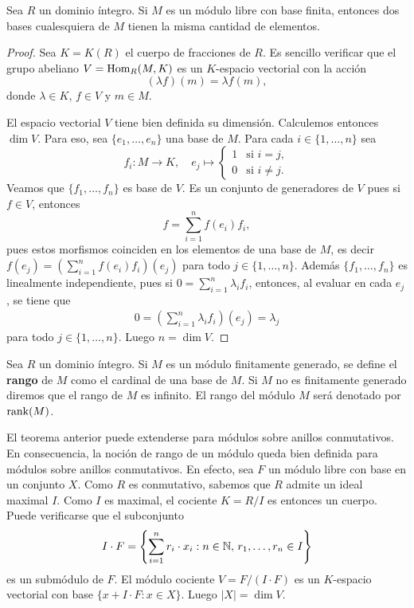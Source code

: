 \begin{theorem}
Sea $R$ un dominio íntegro. 
Si $M$ es un módulo libre con base finita, entonces dos bases cualesquiera de $M$ 
tienen la misma cantidad de elementos.
\end{theorem}

\begin{proof}
Sea $K=K(R)$ el cuerpo de fracciones de $R$. Es sencillo verificar que el grupo abeliano  
$V=\operatorname{Hom}_R(M,K)$ es un $K$-espacio vectorial con la acción 
\[
(\lambda f)(m)=\lambda f(m),
\]
donde $\lambda\in K$, $f\in V$ y $m\in M$.

El espacio vectorial $V$ tiene bien definida su dimensión. 
Calculemos entonces $\dim V$. Para eso, sea $\{e_1,\dots,e_n\}$ una base de $M$. 
Para cada $i\in\{1,\dots,n\}$ sea
\[
f_i\colon M\to K,\quad
e_j\mapsto\begin{cases}
1 & \text{si $i=j$},\\
0 & \text{si $i\ne j$}.
\end{cases}
\]
Veamos que $\{f_1,\dots,f_n\}$ es base de $V$. Es un conjunto de generadores de $V$ pues 
si $f\in V$, entonces
\[
f=\sum_{i=1}^n f(e_i)f_i,
\]
pues estos morfismos coinciden en los elementos de una base de $M$, es decir 
$f(e_j)=(\sum_{i=1}^n f(e_i)f_i)(e_j)$ para todo $j\in\{1,\dots,n\}$.    
Además $\{f_1,\dots,f_n\}$ es linealmente independiente, pues si $0=\sum_{i=1}^n\lambda_if_i$, 
entonces, al evaluar en cada $e_j$, se tiene que 
\begin{align*}
0=\left(\sum_{i=1}^n \lambda_if_i\right)(e_j)=\lambda_j
\end{align*}
para todo $j\in\{1,\dots,n\}$. Luego $n=\dim V$. 
\end{proof}

\begin{definition}
Sea $R$ un dominio íntegro. Si $M$ es un módulo finitamente generado, se 
define el \textbf{rango} de $M$ como el cardinal de una base de $M$. Si $M$ no es finitamente
generado diremos que el rango de $M$ es infinito. El rango del módulo $M$ será denotado por $\operatorname{rank}(M)$.   
\end{definition}


El teorema anterior puede extenderse para módulos sobre anillos conmutativos. En consecuencia,
la noción de rango de un módulo queda bien definida para módulos sobre anillos conmutativos.
En efecto, sea $F$ un módulo libre con base en un conjunto $X$. 
Como $R$ es conmutativo, sabemos que $R$ admite un ideal 
maximal $I$. Como $I$ es maximal, el cociente $K=R/I$ es entonces un cuerpo. Puede verificarse
que el subconjunto
\[
I\cdot F=\left\{\sum_{i=1}^n r_i\cdot x_i:n\in\mathbb{N},\,r_1,\dots,r_n\in I\right\}
\]
es un submódulo de $F$. El módulo cociente $V=F/(I\cdot F)$ es un $K$-espacio
vectorial con base $\{x+I\cdot F:x\in X\}$. Luego $|X|=\dim V$. 